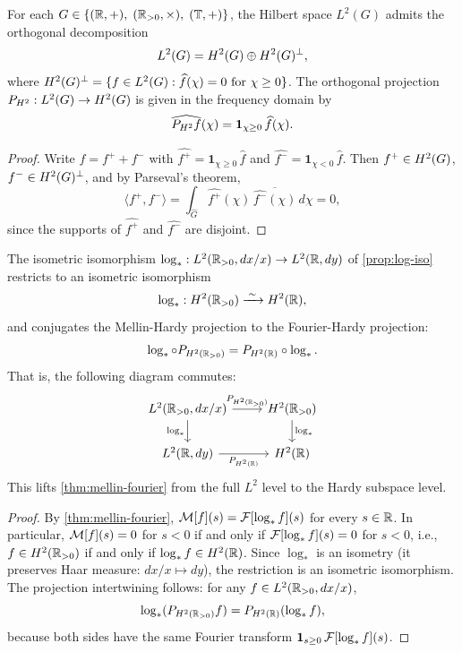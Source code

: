 \begin{proposition}\label{prop:hardy-decomp}
For each $G \in \{(\mathbb{R}, +),\; (\mathbb{R}_{>0}, \times),\; (\mathbb{T}, +)\}$,
the Hilbert space $L^2(G)$ admits the orthogonal decomposition
\begin{equation}\label{eq:hardy-decomp}
L^2(G) = H^2(G) \oplus H^2(G)^\perp,
\end{equation}
where $H^2(G)^\perp = \{f \in L^2(G) : \widehat{f}(\chi) = 0 \text{ for } \chi \geq 0\}$. The orthogonal projection $P_{H^2} : L^2(G) \to H^2(G)$ is given in the frequency domain by
\[
\widehat{P_{H^2} f}(\chi) = \mathbf{1}_{\chi \geq 0}\, \widehat{f}(\chi).
\]
\end{proposition}

\begin{proof}
Write $f = f^+ + f^-$ with $\widehat{f^+} = \mathbf{1}_{\chi \geq 0}\,\widehat{f}$ and $\widehat{f^-} = \mathbf{1}_{\chi < 0}\,\widehat{f}$. Then $f^+ \in H^2(G)$, $f^- \in H^2(G)^\perp$, and by Parseval's theorem,
\[
\langle f^+, f^- \rangle = \int_{\widehat{G}} \widehat{f^+}(\chi)\, \overline{\widehat{f^-}(\chi)}\, d\chi = 0,
\]
since the supports of $\widehat{f^+}$ and $\widehat{f^-}$ are disjoint.
\end{proof}

\begin{theorem}\label{thm:hardy-duality}
The isometric isomorphism $\log_* : L^2(\mathbb{R}_{>0}, dx/x) \to L^2(\mathbb{R}, dy)$ of \cref{prop:log-iso} restricts to an isometric isomorphism
\[
\log_* : H^2(\mathbb{R}_{>0}) \xrightarrow{\;\sim\;} H^2(\mathbb{R}),
\]
and conjugates the Mellin-Hardy projection to the Fourier-Hardy projection:
\[
\log_* \circ P_{H^2(\mathbb{R}_{>0})} = P_{H^2(\mathbb{R})} \circ \log_*.
\]
That is, the following diagram commutes:
\begin{equation}\label{eq:cd-hardy}
\begin{tikzcd}
L^2(\Rpos, dx/x) \arrow[r, "P_{\Htwo(\Rpos)}"] \arrow[d, "\log_*"'] & \Htwo(\Rpos) \arrow[d, "\log_*"] \\
L^2(\R, dy) \arrow[r, "P_{\Htwo(\R)}"'] & \Htwo(\R)
\end{tikzcd}
\end{equation}
This lifts \cref{thm:mellin-fourier} from the full $L^2$ level to the Hardy subspace level.
\end{theorem}

\begin{proof}
By \cref{thm:mellin-fourier}, $\mathcal{M}[f](s) = \mathcal{F}[\log_* f](s)$ for every $s \in \mathbb{R}$. In particular, $\mathcal{M}[f](s) = 0$ for $s < 0$ if and only if $\mathcal{F}[\log_* f](s) = 0$ for $s < 0$, i.e., $f \in H^2(\mathbb{R}_{>0})$ if and only if $\log_* f \in H^2(\mathbb{R})$. Since $\log_*$ is an isometry (it preserves Haar measure: $dx/x \mapsto dy$), the restriction is an isometric isomorphism. The projection intertwining follows: for any $f \in L^2(\mathbb{R}_{>0}, dx/x)$,
\[
\log_*(P_{H^2(\mathbb{R}_{>0})} f) = P_{H^2(\mathbb{R})}(\log_* f),
\]
because both sides have the same Fourier transform $\mathbf{1}_{s \geq 0}\, \mathcal{F}[\log_* f](s)$.
\end{proof}

